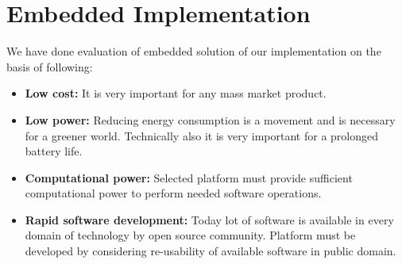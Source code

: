 
\chapter{Embedded Implementation} %
\label{Chapter3}
We have done evaluation of embedded solution of our implementation on
the basis of following:
\begin{itemize}
 \item \textbf{Low cost:} It is very important for any mass
 market product.
 \item \textbf{Low power:} Reducing energy consumption is a
 movement and is necessary for a greener world.
 Technically also it is very important for a prolonged
 battery life.
 \item \textbf{Computational power:} Selected platform must
 provide sufficient computational power to perform
 needed software operations.
 \item \textbf{Rapid software development:} Today lot of software
 is available in every domain of technology by open source
 community. Platform must be developed by considering
 re-usability of available software in public domain.
\end{itemize}

